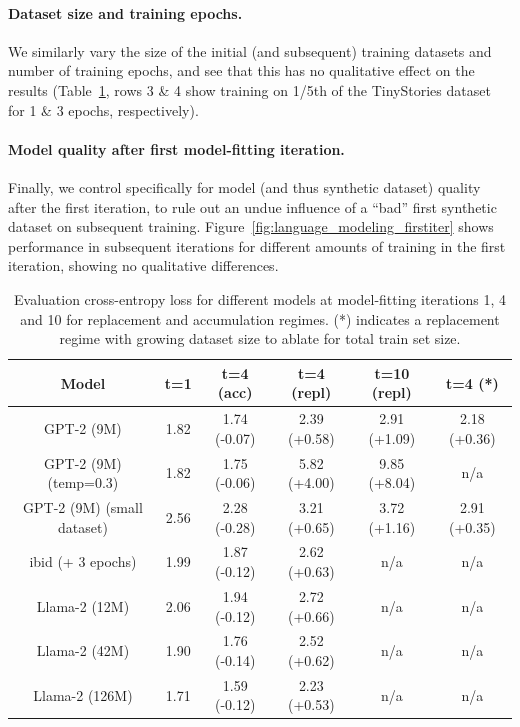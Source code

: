 \paragraph{Dataset size and training epochs.} We similarly vary the size of the initial (and subsequent) training datasets and number of training epochs, and see that this has no qualitative effect on the results (Table~\ref{tab:lm_eval_loss}, rows 3 \& 4 show training on 1/5th of the TinyStories dataset for 1 \& 3 epochs, respectively).

\paragraph{Model quality after first model-fitting iteration.} Finally, we control specifically for model (and thus synthetic dataset) quality after the first iteration, to rule out an undue influence of a ``bad'' first synthetic dataset on subsequent training. Figure~\ref{fig:language_modeling_firstiter} shows performance in subsequent iterations for different amounts of training in the first iteration, showing no qualitative differences.

\begin{table}[h!]
    \centering
    \begin{tabular}{c|c|c|c|c|c}
        Model & t=1 & t=4 (acc) & t=4 (repl) & t=10 (repl) & t=4 (*) \\
        \hline 
GPT-2 (9M) & 1.82 & 1.74 (-0.07) & 2.39 (+0.58) & 2.91 (+1.09) & 2.18 (+0.36) \\
GPT-2 (9M) (temp=0.3) & 1.82 & 1.75 (-0.06) & 5.82 (+4.00) & 9.85 (+8.04) & n/a \\
GPT-2 (9M) (small dataset) & 2.56 & 2.28 (-0.28) & 3.21 (+0.65) & 3.72 (+1.16) & 2.91 (+0.35) \\
ibid (+ 3 epochs) & 1.99 & 1.87 (-0.12) & 2.62 (+0.63) & n/a & n/a \\
Llama-2 (12M) & 2.06 & 1.94 (-0.12) & 2.72 (+0.66) & n/a & n/a \\
Llama-2 (42M) & 1.90 & 1.76 (-0.14) & 2.52 (+0.62) & n/a & n/a \\
Llama-2 (126M) & 1.71 & 1.59 (-0.12) & 2.23 (+0.53) & n/a & n/a \\
    \end{tabular}
    \caption{Evaluation cross-entropy loss for different models at model-fitting iterations 1, 4 and 10 for replacement and accumulation regimes. (*) indicates a replacement regime with growing dataset size to ablate for total train set size.}
    \label{tab:lm_eval_loss}
\end{table}



